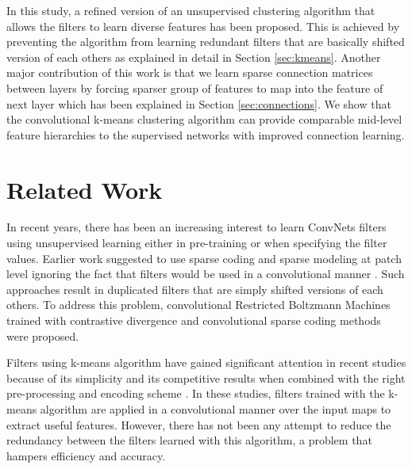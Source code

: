 \documentclass{article} \usepackage{iclr2016_workshop,times}
\begin{document}
In this study, a refined version of an unsupervised clustering algorithm that allows the filters to learn diverse features has been proposed. This is achieved by preventing the algorithm from learning redundant filters that are basically shifted version of each others as explained in detail in Section  \ref{sec:kmeans}. 
Another major contribution of this work is that we learn sparse connection matrices between layers by forcing sparser group of features to map into the feature of next layer which has been explained in Section \ref{sec:connections}.
We show that the convolutional k-means clustering algorithm can provide comparable mid-level feature hierarchies to the supervised networks with improved connection learning. 


\section{Related Work}

In recent years, there has been an increasing interest to learn ConvNets filters using unsupervised learning either in pre-training or when specifying the filter values.
Earlier work suggested to use sparse coding and sparse modeling at patch level ignoring the fact that filters would be used in a convolutional manner \citep{poultney2006efficient,zeiler2010deconvolutional}.
Such approaches result in duplicated filters that are simply shifted versions of each others.
To address this problem, convolutional Restricted Boltzmann Machines trained with contrastive divergence \citep{lee2009convolutional} and convolutional sparse coding \citep{kavukcuoglu2010learning} methods were proposed.

Filters using k-means algorithm have gained significant attention in recent studies because of its simplicity and its competitive results when combined with the right pre-processing and encoding scheme \citep{coates2011importance,lin2014stable}.
In these studies, filters trained with the k-means algorithm are applied in a convolutional manner over the input maps to extract useful features. However, there has not been any attempt to reduce the redundancy between the filters learned with this algorithm, a problem that hampers efficiency and accuracy.
\end{document}
